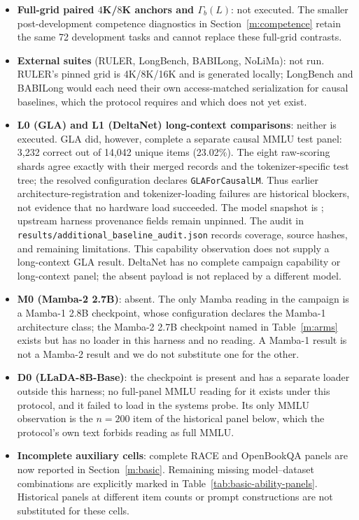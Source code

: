\begin{itemize}[leftmargin=1.2em,itemsep=2pt,topsep=2pt]
\item \textbf{Full-grid paired $4$K/$8$K anchors and $\Gamma_b(L)$}: not executed. The smaller post-development competence diagnostics in Section~\ref{m:competence} retain the same 72 development tasks and cannot replace these full-grid contrasts.
\item \textbf{External suites} (RULER, LongBench, BABILong, NoLiMa): not run. RULER's
pinned grid is 4K/8K/16K and is generated locally; LongBench and BABILong would each need
their own access-matched serialization for causal baselines, which the protocol requires
and which does not yet exist.
\item \textbf{L0 (GLA) and L1 (DeltaNet) long-context comparisons}: neither is executed. GLA did, however, complete a separate causal MMLU test panel: 3,232 correct out of 14,042 unique items (23.02\%). The eight raw-scoring shards agree exactly with their merged records and the tokenizer-specific test tree; the resolved configuration declares \texttt{GLAForCausalLM}. Thus earlier architecture-registration and tokenizer-loading failures are historical blockers, not evidence that no hardware load succeeded. The model snapshot is ; upstream harness provenance fields remain unpinned. The audit in \texttt{results/additional\_baseline\_audit.json} records coverage, source hashes, and remaining limitations. This capability observation does not supply a long-context GLA result. DeltaNet has no complete campaign capability or long-context panel; the absent payload is not replaced by a different model.
\item \textbf{M0 (Mamba-2 2.7B)}: absent. The only Mamba reading in the campaign is a
Mamba-1 2.8B checkpoint, whose configuration declares the Mamba-1 architecture class;
the Mamba-2 2.7B checkpoint named in Table~\ref{m:arms} exists but has no loader in
this harness and no reading. A Mamba-1 result is not a Mamba-2 result and we do not
substitute one for the other.
\item \textbf{D0 (LLaDA-8B-Base)}: the checkpoint is present and has a separate loader
outside this harness; no full-panel MMLU reading for it exists under this protocol, and
it failed to load in the systems probe. Its only MMLU observation is the $n=200$ item of
the historical panel below, which the protocol's own text forbids reading as full MMLU.
\item \textbf{Incomplete auxiliary cells}: complete RACE and OpenBookQA panels are now reported in Section~\ref{m:basic}. Remaining missing model--dataset combinations are explicitly marked in Table~\ref{tab:basic-ability-panels}. Historical panels at different item counts or prompt constructions are not substituted for these cells.

\end{itemize}

